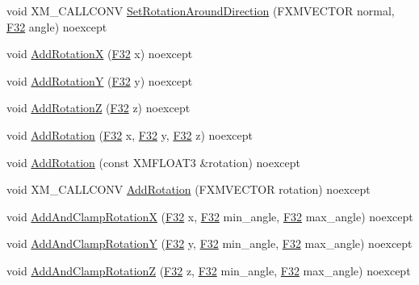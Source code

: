 \begin{DoxyCompactItemize}
\item 
void X\+M\+\_\+\+C\+A\+L\+L\+C\+O\+NV \hyperlink{structmage_1_1_transform_a8d829e3aeef9a2a529ceb405b7b36c64}{Set\+Rotation\+Around\+Direction} (F\+X\+M\+V\+E\+C\+T\+OR normal, \hyperlink{namespacemage_aa97e833b45f06d60a0a9c4fc22ae02c0}{F32} angle) noexcept
\item 
void \hyperlink{structmage_1_1_transform_a920bcbc350d3896bd1d8f9f6233cc008}{Add\+RotationX} (\hyperlink{namespacemage_aa97e833b45f06d60a0a9c4fc22ae02c0}{F32} x) noexcept
\item 
void \hyperlink{structmage_1_1_transform_ab9e20e922cd6e651a984480aa0aa6752}{Add\+RotationY} (\hyperlink{namespacemage_aa97e833b45f06d60a0a9c4fc22ae02c0}{F32} y) noexcept
\item 
void \hyperlink{structmage_1_1_transform_a973e713992328de9f5ad3b6ed4779f40}{Add\+RotationZ} (\hyperlink{namespacemage_aa97e833b45f06d60a0a9c4fc22ae02c0}{F32} z) noexcept
\item 
void \hyperlink{structmage_1_1_transform_a3204b0669d2735a4c05af1f6e10b46b1}{Add\+Rotation} (\hyperlink{namespacemage_aa97e833b45f06d60a0a9c4fc22ae02c0}{F32} x, \hyperlink{namespacemage_aa97e833b45f06d60a0a9c4fc22ae02c0}{F32} y, \hyperlink{namespacemage_aa97e833b45f06d60a0a9c4fc22ae02c0}{F32} z) noexcept
\item 
void \hyperlink{structmage_1_1_transform_af59988a981b0914eb6b649f1f9602542}{Add\+Rotation} (const X\+M\+F\+L\+O\+A\+T3 \&rotation) noexcept
\item 
void X\+M\+\_\+\+C\+A\+L\+L\+C\+O\+NV \hyperlink{structmage_1_1_transform_ae131948e8d2c34d1207e2188f75a3e9f}{Add\+Rotation} (F\+X\+M\+V\+E\+C\+T\+OR rotation) noexcept
\item 
void \hyperlink{structmage_1_1_transform_a401e2b3b3fb0675cb439329ee931d9f0}{Add\+And\+Clamp\+RotationX} (\hyperlink{namespacemage_aa97e833b45f06d60a0a9c4fc22ae02c0}{F32} x, \hyperlink{namespacemage_aa97e833b45f06d60a0a9c4fc22ae02c0}{F32} min\+\_\+angle, \hyperlink{namespacemage_aa97e833b45f06d60a0a9c4fc22ae02c0}{F32} max\+\_\+angle) noexcept
\item 
void \hyperlink{structmage_1_1_transform_aff1d8909255e85eb0100e90b2ac5068a}{Add\+And\+Clamp\+RotationY} (\hyperlink{namespacemage_aa97e833b45f06d60a0a9c4fc22ae02c0}{F32} y, \hyperlink{namespacemage_aa97e833b45f06d60a0a9c4fc22ae02c0}{F32} min\+\_\+angle, \hyperlink{namespacemage_aa97e833b45f06d60a0a9c4fc22ae02c0}{F32} max\+\_\+angle) noexcept
\item 
void \hyperlink{structmage_1_1_transform_a6b8797abb38b3bbe894193c89bb63a71}{Add\+And\+Clamp\+RotationZ} (\hyperlink{namespacemage_aa97e833b45f06d60a0a9c4fc22ae02c0}{F32} z, \hyperlink{namespacemage_aa97e833b45f06d60a0a9c4fc22ae02c0}{F32} min\+\_\+angle, \hyperlink{namespacemage_aa97e833b45f06d60a0a9c4fc22ae02c0}{F32} max\+\_\+angle) noexcept

\end{DoxyCompactItemize}
